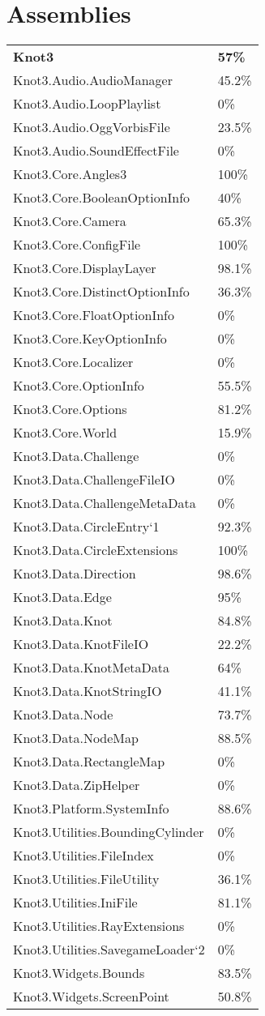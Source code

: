 \documentclass[a4paper,10pt]{article}
\begin{document}
\section{Assemblies}
\begin{longtable}[l]{ll}
\textbf{Knot3} & \textbf{57\%}\\
Knot3.Audio.AudioManager & 45.2\%\\
Knot3.Audio.LoopPlaylist & 0\%\\
Knot3.Audio.OggVorbisFile & 23.5\%\\
Knot3.Audio.SoundEffectFile & 0\%\\
Knot3.Core.Angles3 & 100\%\\
Knot3.Core.BooleanOptionInfo & 40\%\\
Knot3.Core.Camera & 65.3\%\\
Knot3.Core.ConfigFile & 100\%\\
Knot3.Core.DisplayLayer & 98.1\%\\
Knot3.Core.DistinctOptionInfo & 36.3\%\\
Knot3.Core.FloatOptionInfo & 0\%\\
Knot3.Core.KeyOptionInfo & 0\%\\
Knot3.Core.Localizer & 0\%\\
Knot3.Core.OptionInfo & 55.5\%\\
Knot3.Core.Options & 81.2\%\\
Knot3.Core.World & 15.9\%\\
Knot3.Data.Challenge & 0\%\\
Knot3.Data.ChallengeFileIO & 0\%\\
Knot3.Data.ChallengeMetaData & 0\%\\
Knot3.Data.CircleEntry`1 & 92.3\%\\
Knot3.Data.CircleExtensions & 100\%\\
Knot3.Data.Direction & 98.6\%\\
Knot3.Data.Edge & 95\%\\
Knot3.Data.Knot & 84.8\%\\
Knot3.Data.KnotFileIO & 22.2\%\\
Knot3.Data.KnotMetaData & 64\%\\
Knot3.Data.KnotStringIO & 41.1\%\\
Knot3.Data.Node & 73.7\%\\
Knot3.Data.NodeMap & 88.5\%\\
Knot3.Data.RectangleMap & 0\%\\
Knot3.Data.ZipHelper & 0\%\\
Knot3.Platform.SystemInfo & 88.6\%\\
Knot3.Utilities.BoundingCylinder & 0\%\\
Knot3.Utilities.FileIndex & 0\%\\
Knot3.Utilities.FileUtility & 36.1\%\\
Knot3.Utilities.IniFile & 81.1\%\\
Knot3.Utilities.RayExtensions & 0\%\\
Knot3.Utilities.SavegameLoader`2 & 0\%\\
Knot3.Widgets.Bounds & 83.5\%\\
Knot3.Widgets.ScreenPoint & 50.8\%\\
\end{longtable}
\end{document}
